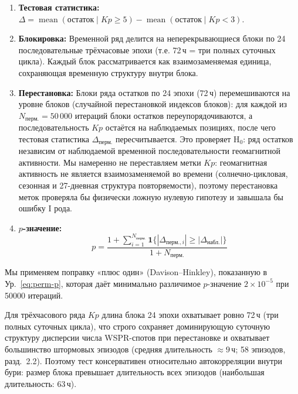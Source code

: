\documentclass{agujournal2019}
\begin{document}
\begin{enumerate}
	\item \textbf{Тестовая статистика:}
	      $\Delta = \operatorname{mean}(\mbox{остаток} \mid Kp \ge 5)
		      - \operatorname{mean}(\mbox{остаток} \mid Kp < 3)$.
	\item \textbf{Блокировка:} Временной ряд делится на неперекрывающиеся
	      блоки по 24 последовательные трёхчасовые эпохи (т.е. 72\,ч = три
	      полных суточных цикла). Каждый блок рассматривается как
	      взаимозаменяемая единица, сохраняющая временную структуру внутри
	      блока.
	\item \textbf{Перестановка:} Блоки ряда остатков по 24 эпохи (72\,ч)
	      перемешиваются на уровне блоков (случайной перестановкой
	      индексов блоков): для каждой из $N_{\mbox{перм.}} = 50\,000$
	      итераций блоки остатков переупорядочиваются, а
	      последовательность $Kp$ остаётся на наблюдаемых позициях, после
	      чего тестовая статистика $\Delta_{\mbox{перм.}}$ пересчитывается.
	      Это проверяет H$_0$: ряд остатков независим от наблюдаемой
	      временной последовательности геомагнитной активности. Мы
	      намеренно не переставляем метки $Kp$: геомагнитная активность
	      не является взаимозаменяемой во времени (солнечно-цикловая,
	      сезонная и 27-дневная структура повторяемости), поэтому
	      перестановка меток проверяла бы физически ложную нулевую
	      гипотезу и завышала бы ошибку I рода.
	\item \textbf{$p$-значение:}
	      \begin{equation}
		      p = \frac{1 + \sum_{i=1}^{N_{\mbox{перм.}}}
			      \mathbf{1}\{ |\Delta_{\mbox{перм.}, i}| \ge |\Delta_{\mbox{набл.}}| \}}
			      {1 + N_{\mbox{перм.}}}
		      \label{eq:perm-p}
	      \end{equation}
\end{enumerate}

Мы применяем поправку «плюс один» (Davison--Hinkley), показанную в
Ур.~\eqref{eq:perm-p}, которая даёт минимально различимое
$p$-значение $2 \times 10^{-5}$ при \num{50000} итераций.

Для трёхчасового ряда $Kp$ длина блока 24 эпохи охватывает ровно 72\,ч
(три полных суточных цикла), что строго сохраняет доминирующую суточную
структуру дисперсии числа WSPR-спотов при перестановке и охватывает
большинство штормовых эпизодов (средняя длительность $\approx 9$\,ч;
58 эпизодов, разд.~2.2). Поэтому тест консервативен относительно
автокорреляции внутри бури: размер блока превышает длительность всех
эпизодов (наибольшая длительность: 63\,ч).
\end{document}

